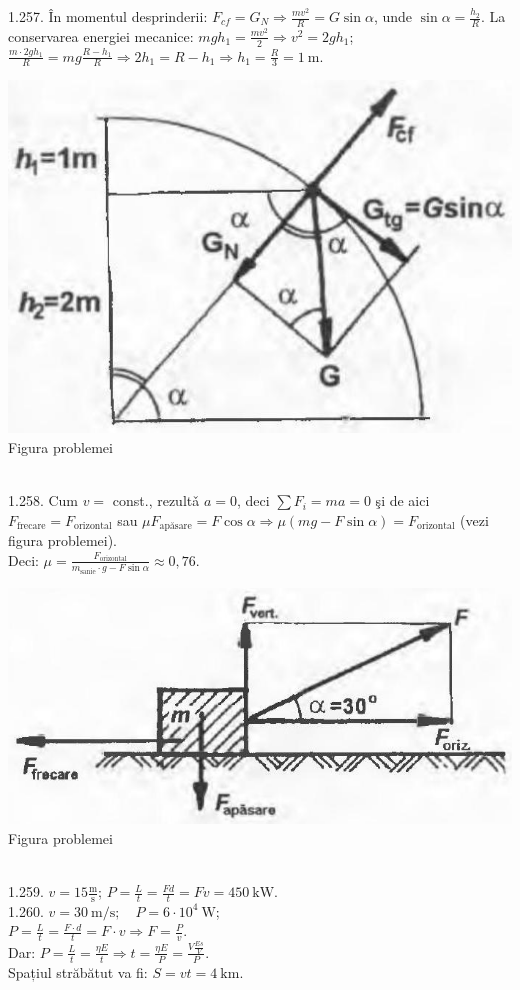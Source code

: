 1.257. În momentul desprinderii: $F_{c f}=G_{N} \Rightarrow \frac{m v^{2}}{R}=G \sin \alpha$, unde $\sin \alpha=\frac{h_{2}}{R}$. La conservarea energiei mecanice: $m g h_{1}=\frac{m v^{2}}{2} \Rightarrow v^{2}=2 g h_{1}$;\\ $\frac{m \cdot 2 g h_{1}}{R}=m g \frac{R-h_{1}}{R} \Rightarrow 2 h_{1}=R-h_{1} \Rightarrow h_{1}=\frac{R}{3}=1 \mathrm{~m}$.\\ \begin{center} \includegraphics[width=0.4\linewidth]{images/2025_07_01_5b3ff9fa0d508c8e9f17g-253(3)}\\ Figura problemei \end{center}\\

1.258. Cum $v=$ const., rezultǎ $a=0$, deci $\sum F_{i}=m a=0$ şi de aici $F_{\text {frecare}}=F_{\text {orizontal}}$ sau $\mu F_{\text {apăsare}}=F \cos \alpha \Rightarrow \mu(m g-F \sin \alpha)=F_{\text {orizontal}}$ (vezi figura problemei).\\ Deci: $\mu=\frac{F_{\text {orizontal}}}{m_{\text {sanie}} \cdot g-F \sin \alpha} \approx 0,76$.\\ \begin{center} \includegraphics[width=0.4\linewidth]{images/2025_07_01_5b3ff9fa0d508c8e9f17g-253}\\ Figura problemei \end{center}\\

1.259. $v=15 \frac{\mathrm{m}}{\mathrm{s}}$; \quad $P=\frac{L}{t}=\frac{F d}{t}=F v=450 \mathrm{~kW}$.\\

1.260. $v=30 \mathrm{~m} / \mathrm{s}; \quad P=6 \cdot 10^{4} \mathrm{~W}$;\\ $P=\frac{L}{t}=\frac{F \cdot d}{t}=F \cdot v \Rightarrow F=\frac{P}{v}$.\\ Dar: $P=\frac{L}{t}=\frac{\eta E}{t} \Rightarrow t=\frac{\eta E}{P}=\frac{V \frac{E s}{V}}{P}$.\\ Spațiul străbătut va fi: $S=v t=4 \mathrm{~km}$.\\

